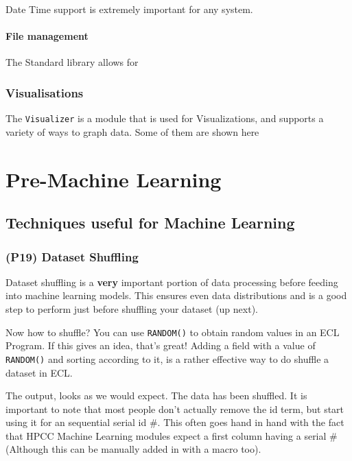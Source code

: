 \documentclass[a4paper,oneside,12pt]{book}
\begin{document}
Date Time support is extremely important for any system. 

\subsubsection{File management}

The Standard library allows for 



\subsection{Visualisations}
The \lstinline!Visualizer! is a module that is used for Visualizations, and supports a variety of ways to graph data. Some of them are shown here


\chapter{Pre-Machine Learning}
\section{Techniques useful for Machine Learning}
\subsection{(P19) Dataset Shuffling}

Dataset shuffling is a \textbf{very} important portion of data processing before feeding into machine learning models. This ensures even data distributions and is a good step to perform just before shuffling your dataset (up next).

Now how to shuffle? You can use \lstinline{RANDOM()} to obtain random values in an ECL Program. If this gives an idea, that's great! Adding a field with a value of \lstinline{RANDOM()} and sorting according to it, is a rather effective way to do shuffle a dataset in ECL.



The output, looks as we would expect. The data has been shuffled. It is important to note that most people don't actually remove the id term, but start using it for an sequential serial id \#. This often goes hand in hand with the fact that HPCC Machine Learning modules expect a first column having a serial \# (Although this can be manually added in with a macro too).
\end{document}
